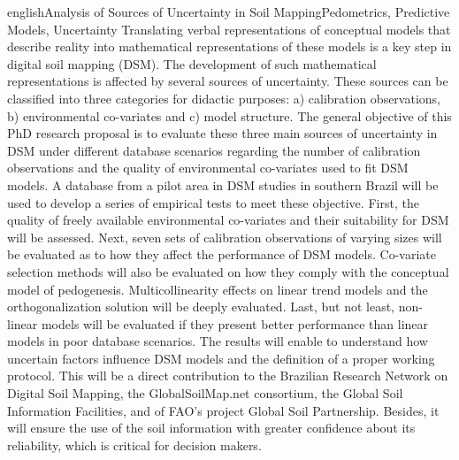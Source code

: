 \documentclass[tese,english]{UFRuralRJ}
\begin{document}
\def\tituloingles{Analysis of Sources of Uncertainty in Soil Mapping}
\def\chavesingles{Pedometrics, Predictive Models, Uncertainty}
\generalabstracttrue
\begin{generalabstract}{english}{\tituloingles}{\chavesingles}
Translating verbal representations of conceptual models that describe reality 
into mathematical representations of these models is a key step in digital soil 
mapping (DSM). The development of such mathematical representations is affected 
by several sources of uncertainty. These sources can be classified into three 
categories for didactic purposes: a) calibration observations, b) environmental
co-variates and c) model structure. The general objective of this PhD research 
proposal is to evaluate these three main sources of uncertainty in DSM under 
different database scenarios regarding the number of calibration observations 
and the quality of environmental co-variates used to fit DSM models. A database 
from a pilot area in DSM studies in southern Brazil will be used to develop a 
series of empirical tests to meet these objective. First, the quality of freely 
available environmental co-variates and their suitability for DSM will be 
assessed. Next, seven sets of calibration observations of varying sizes will be 
evaluated as to how they affect the performance of DSM models. Co-variate 
selection methods will also be evaluated on how they comply with the conceptual 
model of pedogenesis. Multicollinearity effects on linear trend models and the 
orthogonalization solution will be deeply evaluated. Last, but not least, 
non-linear models will be evaluated if they present better performance than 
linear models in poor database scenarios. The results will enable to understand 
how uncertain factors influence DSM models and the definition of a proper 
working protocol. This will be a direct contribution to the Brazilian Research 
Network on Digital Soil Mapping, the GlobalSoilMap.net consortium, the Global 
Soil Information Facilities, and of FAO's project Global Soil Partnership. 
Besides, it will ensure the use of the soil information with greater confidence 
about its reliability, which is critical for decision makers.
\end{generalabstract}
\end{document}
